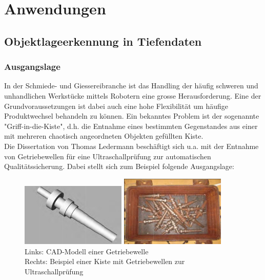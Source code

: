 \section{Anwendungen}

\subsection{Objektlageerkennung in Tiefendaten} 

\subsubsection{Ausgangslage}
In der Schmiede- und Giessereibranche ist das Handling der häufig schweren und unhandlichen Werkstücke mittels Robotern eine grosse Herausforderung. Eine der Grundvoraussetzungen ist dabei auch eine hohe Flexibilität um häufige Produktwechsel behandeln zu können. Ein bekanntes Problem ist der sogenannte "Griff-in-die-Kiste", d.h. die Entnahme eines bestimmten Gegenstandes aus einer mit mehreren chaotisch angeordneten Objekten gefüllten Kiste. \\

Die Dissertation \cite{Diss-Ledermann} von Thomas Ledermann beschäftigt sich u.a. mit der Entnahme von Getriebewellen für eine Ultraschallprüfung zur automatischen Qualitätssicherung. Dabei stellt sich zum Beispiel folgende Ausgangslage: \\

\begin{figure}[htbp]
	\centering
	\begin{minipage}{6cm}
		\includegraphics[width=5cm]{images/welle-cad}
	\end{minipage}
	\begin{minipage}{6cm}
		\includegraphics[width=5cm]{images/welle-kiste}
	\end{minipage}
	\caption{	Links: CAD-Modell einer Getriebewelle \\
				Rechts: Beispiel einer Kiste mit Getriebewellen zur Ultraschallprüfung}
	\label{Fig-Getriebewelle}
\end{figure}

